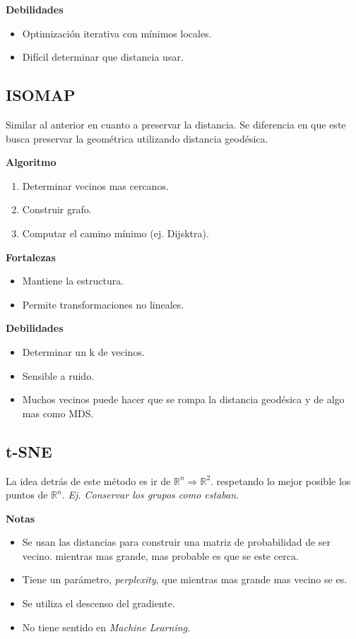 \documentclass[titlepage,a4paper]{article}
\begin{document}
\textbf{Debilidades}
\begin{itemize}
    \item Optimización iterativa con mínimos locales.
    \item Difícil determinar que distancia usar.
\end{itemize}


\subsection{ISOMAP}

Similar al anterior en cuanto a preservar la distancia. Se diferencia en que este busca preservar la geométrica utilizando distancia geodésica.

\textbf{Algoritmo}
\begin{enumerate}
    \item Determinar vecinos mas cercanos.
    \item Construir grafo.
    \item Computar el camino mínimo (ej. Dijsktra).
\end{enumerate}

\textbf{Fortalezas}
\begin{itemize}
    \item Mantiene la estructura.
    \item Permite transformaciones no lineales.
\end{itemize}

\textbf{Debilidades}
\begin{itemize}
    \item Determinar un k de vecinos.
    \item Sensible a ruido.
    \item Muchos vecinos puede hacer que se rompa la distancia geodésica y de algo mas como MDS.
\end{itemize}


\subsection{t-SNE}

La idea detrás de este método es ir de $\mathbb{R}^{n} \Rightarrow \mathbb{R}^{2}$. respetando lo mejor posible los puntos de $\mathbb{R}^{n}$. \textit{Ej. Conservar los grupos como estaban.}

\textbf{Notas}
\begin{itemize}
    \item Se usan las distancias para construir una matriz de probabilidad de ser vecino. mientras mas grande, mas probable es que se este cerca.

    \item Tiene un parámetro, \textit{perplexity}, que mientras mas grande mas vecino se es.
    
    \item Se utiliza el descenso del gradiente.
    
    \item No tiene sentido en \textit{Machine Learning}.
\end{itemize}
\end{document}
